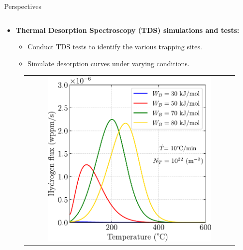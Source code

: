 \documentclass[9pt]{beamer}
\begin{document}

\begin{frame}{Perspectives}

    \begin{columns}

        \begin{column}{0.5\textwidth}
			\begin{itemize}
				\item \textbf{Thermal Desorption Spectroscopy (TDS) simulations and tests:} 
				\vspace{0.25cm}
				\begin{itemize}
					\item Conduct TDS tests to identify the various trapping sites.
					\vspace{0.2cm}
					\item Simulate desorption curves under varying conditions. 
				\end{itemize}
			\end{itemize}
			
			\begin{figure}
        		\begin{tabular}{c}
            		\includegraphics[width=0.8\textwidth]{Images/plot_TDS_WB.pdf} \\
        		\end{tabular}
    		\end{figure}
    		
    	\end{column}
    	

\end{columns}
\end{frame}
\end{document}
